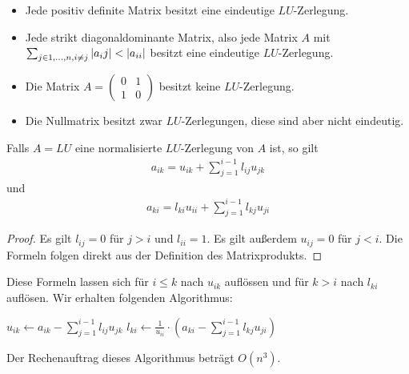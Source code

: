 \documentclass{report}
\begin{document}
\begin{corollary}
	\phantom{}
	\begin{itemize}
		\item Jede positiv definite Matrix besitzt eine eindeutige $LU$-Zerlegung.
		\item Jede strikt diagonaldominante Matrix, also jede Matrix $A$ mit $\sum_{j \in 1, \hdots, n, i \neq j} \abs{a_ij} < \abs{a_{ii}}$ besitzt eine eindeutige $LU$-Zerlegung.
		\item Die Matrix $A = \begin{pmatrix}
			0 & 1\\
			1 & 0
		\end{pmatrix}$
		besitzt keine $LU$-Zerlegung.
		\item Die Nullmatrix besitzt zwar $LU$-Zerlegungen, diese sind aber nicht eindeutig.
	\end{itemize}
\end{corollary}
\begin{lemma}
	Falls $A = LU$ eine normalisierte $LU$-Zerlegung von $A$ ist, so gilt
	\begin{align*}
		a_{ik} = u_{ik} + \sum_{j = 1}^{i-1} l_{ij} u_{jk}
	\end{align*}
	und
	\begin{align*}
		a_{ki} = l_{ki} u_{ii} + \sum_{j = 1}^{i-1} l_{kj} u_{ji}
	\end{align*}
\end{lemma}
\begin{proof}
	Es gilt $l_{ij} = 0$ für $j > i$ und $l_{ii} = 1$. Es gilt außerdem $u_{ij} = 0$ für $j < i$. Die Formeln folgen direkt aus der Definition des Matrixprodukts.
\end{proof}
Diese Formeln lassen sich für $i \leq k$ nach $u_{ik}$ auflössen und für $k > i$ nach $l_{ki}$ auflösen. Wir erhalten folgenden Algorithmus:
\begin{algorithm}
\begin{algorithmic}[1]
			\State $\displaystyle u_{ik} \gets a_{ik} - \sum_{j = 1}^{i-1}l_{ij}u_{jk}$
		\EndFor
		\State $\displaystyle l_{ki} \gets \frac{1}{u_{ii}} \cdot \left(a_{ki} - \sum_{j = 1}^{i-1}l_{kj}u_{ji}\right)$
		\EndFor
	\EndFor
\end{algorithmic}
\end{algorithm}
\begin{proposition}
	Der Rechenauftrag dieses Algorithmus beträgt $O(n^3)$.
\end{proposition}
\end{document}
